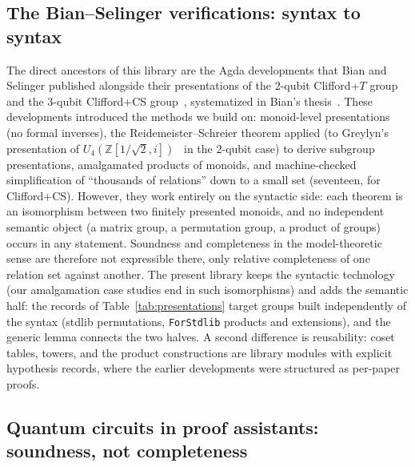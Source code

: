 \subsection{The Bian--Selinger verifications: syntax to syntax}\label{sec:rel-bs}

The direct ancestors of this library are the Agda developments that Bian
and Selinger published alongside their presentations of the $2$-qubit
Clifford+$T$ group~\cite{bian2023cliffordt2} and the $3$-qubit
Clifford+CS group~\cite{bian2023cliffordcs3}, systematized in Bian's
thesis~\cite{bian2023thesis}.  These developments introduced
the methods we build on: monoid-level presentations (no formal inverses),
the Reidemeister--Schreier theorem applied (to Greylyn's presentation
of $U_4(\mathbb{Z}[1/\sqrt2,i])$~\cite{greylyn2014} in the $2$-qubit
case) to derive subgroup presentations,
amalgamated products of monoids, and machine-checked simplification of
``thousands of relations'' down to a small set (seventeen, for
Clifford+CS).  However, they
work entirely on the syntactic side: each theorem is an isomorphism
between two finitely
presented monoids, and no independent semantic object (a matrix group,
a permutation group, a product of groups) occurs in any statement.
Soundness and completeness in the model-theoretic sense are therefore not
expressible there, only relative completeness of one relation set against
another.  The present library keeps the syntactic technology (our
amalgamation case studies end in such isomorphisms) and adds the
semantic half: the  records of
Table~\ref{tab:presentations} target groups built independently of the
syntax (stdlib permutations, \texttt{ForStdlib} products and
extensions), and the generic  lemma
connects the two halves.  A second difference is reusability: coset tables,
towers, and the product constructions are library modules
with explicit hypothesis records, where the earlier developments were
structured as per-paper proofs.

\subsection{Quantum circuits in proof assistants: soundness, not completeness}\label{sec:rel-qc}

